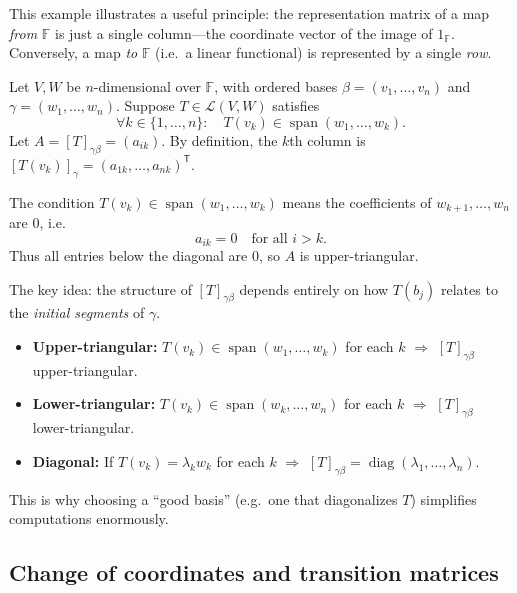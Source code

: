 This example illustrates a useful principle: the representation matrix of a map \emph{from} $\mathbb{F}$ is just a single column---the coordinate vector of the image of $1_\mathbb{F}$.
Conversely, a map \emph{to} $\mathbb{F}$ (i.e.\ a linear functional) is represented by a single \emph{row}.

\begin{examplebox}[title={Worked Example (Tutorial 7, Question 2): nested span condition $\Rightarrow$ upper-triangular}]
Let $V,W$ be $n$-dimensional over $\mathbb{F}$, with ordered bases $\beta=(v_1,\dots,v_n)$ and $\gamma=(w_1,\dots,w_n)$.
Suppose $T\in\mathcal{L}(V,W)$ satisfies
\[
\forall k\in\{1,\dots,n\}:\quad T(v_k)\in \operatorname{span}(w_1,\dots,w_k).
\]
Let $A=[T]_{\gamma\beta}=(a_{ik})$. By definition, the $k$th column is $[T(v_k)]_\gamma=(a_{1k},\dots,a_{nk})^{\mathsf T}$.

The condition $T(v_k)\in\operatorname{span}(w_1,\dots,w_k)$ means the coefficients of $w_{k+1},\dots,w_n$ are $0$, i.e.
\[
a_{ik}=0\quad\text{for all }i>k.
\]
Thus all entries below the diagonal are $0$, so $A$ is upper-triangular.
\end{examplebox}

\begin{examtip}[title={Exam Focus: when does a matrix representation come out upper/lower-triangular?}]
The key idea: the structure of $[T]_{\gamma\beta}$ depends entirely on how $T(b_j)$ relates to the \emph{initial segments} of $\gamma$.
\begin{itemize}
\item \textbf{Upper-triangular:} $T(v_k)\in\operatorname{span}(w_1,\dots,w_k)$ for each $k$ $\Longrightarrow$ $[T]_{\gamma\beta}$ upper-triangular.
\item \textbf{Lower-triangular:} $T(v_k)\in\operatorname{span}(w_k,\dots,w_n)$ for each $k$ $\Longrightarrow$ $[T]_{\gamma\beta}$ lower-triangular.
\item \textbf{Diagonal:} If $T(v_k)=\lambda_k w_k$ for each $k$ $\Longrightarrow$ $[T]_{\gamma\beta}=\operatorname{diag}(\lambda_1,\dots,\lambda_n)$.
\end{itemize}
This is why choosing a ``good basis'' (e.g.\ one that diagonalizes $T$) simplifies computations enormously.
\end{examtip}

\subsection{Change of coordinates and transition matrices}

